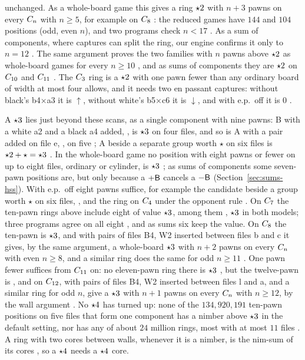 unchanged. As a whole-board game this gives a ring $\mathord{\star2}$ with $n+3$ pawns on
every $C_{n}$ with $n\ge5$, for example  on $C_{8}$ : the
reduced games have $144$ and $104$ positions (odd, even $n$), and two programs check $n<17$ . As a sum of components, where captures can split the ring, our engine confirms it only
to $n=12$ . The same argument proves the two families with $n$ pawns above $\mathord{\star2}$ as whole-board games for every
$n\ge10$ , and as sums of components they are $\mathord{\star2}$ on $C_{10}$ and $C_{11}$ . The $C_{3}$ ring is a $\mathord{\star2}$ with one pawn fewer than any ordinary board of width at most four allows,
and it needs two en passant captures: without black's b4$\times$a3 it is $\uparrow$, without white's
b5$\times$c6 it is $\downarrow$, and with e.p.\ off it is $0$ .

A $\mathord{\star3}$ lies just beyond these scans, as a single component with nine pawns: B with a white a2 and a black a4 added, , is $\mathord{\star3}$ on four
files, and so is A with a pair added on file e, , on five ; A beside a separate group worth
$\star$ on six files is $\mathord{\star2}+\star=\mathord{\star3}$ . In the whole-board game no position with eight pawns or
fewer on up to eight files, ordinary or cylinder, is $\mathord{\star3}$ ; as sums of components some seven-pawn positions are, but only because a $+\mathsf{B}$
cancels a $-\mathsf{B}$ (Section~\ref{sec:sums-hss}). With e.p.\ off eight pawns suffice, for example the candidate
beside a group worth $\star$ on six files, , and the ring  on $C_{4}$ under the opponent rule . On $C_{7}$ the ten-pawn rings above include
eight of value $\mathord{\star3}$, among them , $\mathord{\star3}$ in both models;
three programs agree on all eight , and as sums six keep the value. On $C_{8}$ the ten-pawn  is $\mathord{\star3}$, and with pairs of files B4, W2
inserted between files b and c it gives, by the same argument, a whole-board $\mathord{\star3}$ with $n+2$ pawns on every
$C_{n}$ with even $n\ge8$, and a similar ring does the same for odd $n\ge11$ . One pawn fewer
suffices from $C_{11}$ on: no eleven-pawn ring there is $\mathord{\star3}$ , but the twelve-pawn
 is , and  on $C_{12}$, with pairs of files B4, W2 inserted between files l and a, and a similar ring for odd $n$,
give a $\mathord{\star3}$ with $n+1$ pawns on every $C_{n}$ with $n\ge12$, by the wall argument . No $\mathord{\star4}$ has turned up: none of
the $134{,}920{,}191$ ten-pawn positions on five files that form one component has a nimber above $\mathord{\star3}$
in the default setting, nor has any of about $24$ million rings, most with at most $11$ files . A ring with two
cores between walls, whenever it is a nimber, is the nim-sum of its cores , so a $\mathord{\star4}$ needs a
$\mathord{\star4}$ core.

